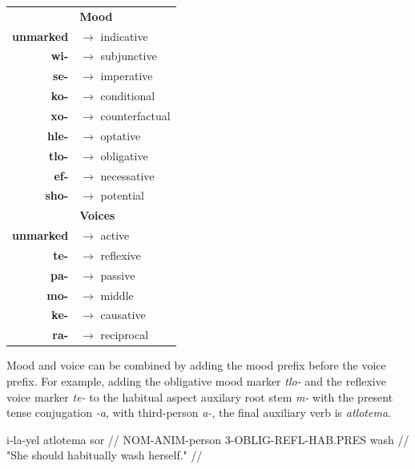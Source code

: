 \begin{tabular}{rl}
&\textbf{Mood}\\
\textbf{unmarked}& $\rightarrow$ indicative \\
\textbf{wi-}& $\rightarrow$ subjunctive \\
\textbf{se-}& $\rightarrow$ imperative \\
\textbf{ko-} & $\rightarrow$ conditional \\
\textbf{xo-}& $\rightarrow$ counterfactual \\
\textbf{hle-}& $\rightarrow$ optative \\
\textbf{tlo-}& $\rightarrow$ obligative \\
\textbf{ef-}& $\rightarrow$ necessative \\
\textbf{sho-}& $\rightarrow$ potential \\



&\textbf{Voices}\\
\textbf{unmarked}& $\rightarrow$ active \\
\textbf{te-}& $\rightarrow$ reflexive \\
\textbf{pa-}& $\rightarrow$ passive \\
\textbf{mo-}& $\rightarrow$ middle \\
\textbf{ke-}& $\rightarrow$ causative \\
\textbf{ra-}& $\rightarrow$ reciprocal \\


\end{tabular}

\medskip

Mood and voice can be combined by adding the mood prefix before the voice prefix. For example, adding the obligative mood marker \textit{tlo-} and the reflexive voice marker \textit{te-} to the habitual aspect auxilary root stem \textit{m-} with the present tense conjugation \textit{-a}, with third-person \textit{a-}, the final auxiliary verb is \textit{atlotema}.

\ex
\begingl
\gla i-la-yel atlotema sor //
\glb NOM-ANIM-person 3-OBLIG-REFL-HAB.PRES wash //
\glft "She should habitually wash herself." //
\endgl
\xe



